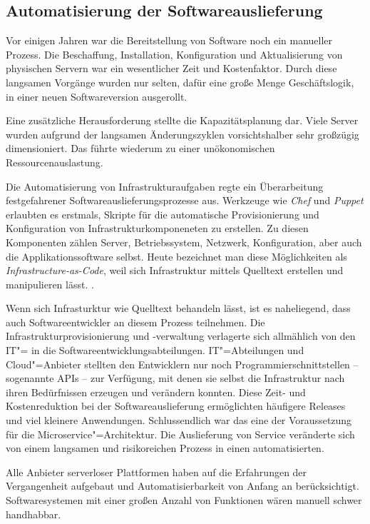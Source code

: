 \subsection{Automatisierung der Softwareauslieferung}

Vor einigen Jahren war die Bereitstellung von Software noch ein manueller Prozess. Die Beschaffung, Installation, Konfiguration und Aktualisierung von physischen Servern war ein wesentlicher Zeit und Kostenfaktor. Durch diese langsamen Vorgänge wurden nur selten, dafür eine große Menge Geschäftslogik, in einer neuen Softwareversion ausgerollt.

Eine zusätzliche Herausforderung stellte die Kapazitätsplanung dar. Viele Server wurden aufgrund der langsamen Änderungszyklen  vorsichtshalber sehr großzügig dimensioniert. Das führte wiederum zu einer unökonomischen Ressourcenauslastung.

Die Automatisierung von Infrastrukturaufgaben regte ein Überarbeitung festgefahrener Softwareauslieferungsprozesse aus. Werkzeuge wie \textit{Chef} und \textit{Puppet} erlaubten es erstmals, Skripte für die automatische Provisionierung und Konfiguration von Infrastrukturkomponeneten zu erstellen. Zu diesen Komponenten zählen Server, Betriebssystem, Netzwerk, Konfiguration, aber auch die Applikationssoftware selbst. Heute bezeichnet man diese Möglichkeiten als \textit{Infrastructure-as-Code}, weil sich Infrastruktur mittels Quelltext erstellen und manipulieren lässt. \cite[135]{Httermann:2012:DD:2380958}.

Wenn sich Infrasturktur wie Quelltext behandeln lässt, ist es naheliegend, dass auch Softwareentwickler an diesem Prozess teilnehmen. Die Infrastrukturprovisionierung und -verwaltung verlagerte sich allmählich von den IT"= in die Softwareentwicklungsabteilungen. IT"=Abteilungen und Cloud"=Anbieter stellten den Entwicklern nur noch Programmierschnittstellen -- sogenannte APIs -- zur Verfügung, mit denen sie selbst die Infrastruktur nach ihren Bedürfnissen erzeugen und verändern konnten. Diese Zeit- und Kostenreduktion bei der Softwareauslieferung ermöglichten häufigere Releases und viel kleinere Anwendungen. Schlussendlich war das eine der Voraussetzung für die Microservice"=Architektur. Die Auslieferung von Service veränderte sich von einem langsamen und risikoreichen Prozess in einen automatisierten.

Alle Anbieter serverloser Plattformen haben auf die Erfahrungen der Vergangenheit aufgebaut und Automatisierbarkeit von Anfang an berücksichtigt. Softwaresystemen mit einer großen Anzahl von Funktionen wären manuell schwer handhabbar. 

